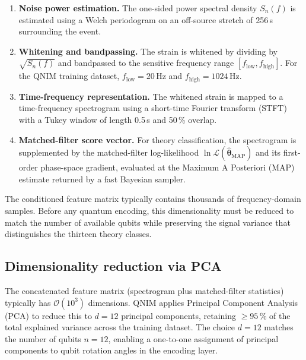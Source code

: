 \documentclass[11pt,a4paper, english]{book}
\theoremstyle{plain}
\theoremstyle{definition}
\numberwithin{equation}{chapter}
\numberwithin{figure}{chapter}
\numberwithin{table}{chapter}
\begin{document}
\begin{enumerate}
  \item \textbf{Noise power estimation.}  The one-sided power spectral
        density $S_n(f)$ is estimated using a Welch periodogram on an
        off-source stretch of 256\,s surrounding the event.

  \item \textbf{Whitening and bandpassing.}  The strain is whitened
        by dividing by $\sqrt{S_n(f)}$ and bandpassed to the sensitive
        frequency range $[f_\mathrm{low}, f_\mathrm{high}]$.  For the
        QNIM training dataset, $f_\mathrm{low} = 20$\,Hz and
        $f_\mathrm{high} = 1024$\,Hz.

  \item \textbf{Time-frequency representation.}  The whitened strain is
        mapped to a time-frequency spectrogram using a short-time Fourier
        transform (STFT) with a Tukey window of length 0.5\,s and
        50\,\% overlap.

  \item \textbf{Matched-filter score vector.}  For theory classification,
        the spectrogram is supplemented by the matched-filter log-likelihood
        $\ln\mathcal{L}(\hat{\boldsymbol{\theta}}_\mathrm{MAP})$ and its
        first-order phase-space gradient, evaluated at the Maximum A
        Posteriori (MAP) estimate returned by a fast Bayesian sampler.
\end{enumerate}

The conditioned feature matrix typically contains thousands of frequency-domain samples.
Before any quantum encoding, this dimensionality must be reduced to match the number
of available qubits while preserving the signal variance that distinguishes the
thirteen theory classes.

\subsection{Dimensionality reduction via PCA}
\label{subsec:pca}

The concatenated feature matrix (spectrogram plus matched-filter
statistics) typically has $\mathcal{O}(10^3)$ dimensions.  QNIM applies
Principal Component Analysis (PCA) to reduce this to $d = 12$ principal
components, retaining $\geq 95\,\%$ of the total explained variance
across the training dataset.  The choice $d = 12$ matches the number of
qubits $n = 12$, enabling a one-to-one assignment of principal components
to qubit rotation angles in the encoding layer.
\end{document}
